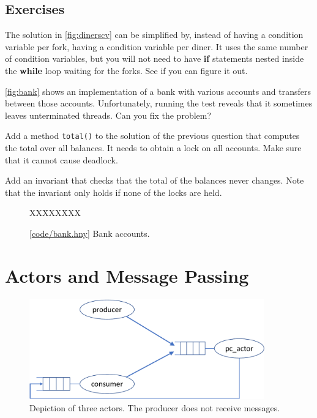 \documentclass{report}
\newcommand{\harmonysource}[1]{
\begin{tabbing}
XX\=XXX\=XXX\kill
    
\end{tabbing}
}
\newcommand{\harmonylink}[1]{%
[\href{https://harmony.cs.cornell.edu/#1}{\underline{#1}}]%
}
\newenvironment{code}{
\tcolorbox
}{
\endtcolorbox
}
\begin{document}
\section*{Exercises}
\begin{problems}
\item The solution in \autoref{fig:dinerscv} can be simplified by, instead
of having a condition variable per fork, having a condition variable per
diner.  It uses the same number of condition variables, but you will not
need to have \textbf{if} statements nested inside the \textbf{while} loop
waiting for the forks.  See if you can figure it out.
\item \label{ex:bank} \autoref{fig:bank} shows an implementation of a bank with various
accounts and transfers between those accounts.
Unfortunately, running the test reveals that it sometimes leaves unterminated
threads.  Can you fix the problem?
\item Add a method \texttt{total()} to the solution of the previous question
that computes the total over all balances.
It needs to obtain a lock on all accounts.  Make sure that
it cannot cause deadlock.
\item Add an invariant that checks that the total of the balances never
changes.  Note that the invariant only holds if none of the locks are
held.
\end{problems}

\begin{figure}
\begin{code}
\harmonysource{bank}
\end{code}
\caption{\harmonylink{code/bank.hny} Bank accounts.}
\label{fig:bank}
\end{figure}

\chapter{Actors and Message Passing}
\label{ch:actor}
%
%

%

\begin{figure}
\begin{center}
\includegraphics[width=4in]{figures/actor-crop.pdf}
\end{center}
\caption{Depiction of three actors.  The producer does not receive messages.}
\label{fig:actorpic}
\end{figure}
\end{document}
